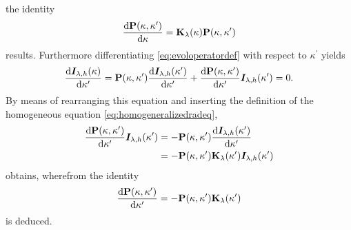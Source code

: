 \documentclass[a4paper,11pt]{report}
\def\lk#1{{\color{black}{#1}}}
\begin{document}
\begin{align}
\begin{aligned}
\end{aligned}
\end{align} the identity \begin{equation}\label{eq:grte_op_id_1}
\frac{\mathrm{d}\boldsymbol{\mathbf{P}}(\kappa,\kappa^\prime)}{\mathrm{d}\kappa} = \boldsymbol{\mathbf{K}}_\lambda(\kappa)\boldsymbol{\mathbf{P}}(\kappa,\kappa^\prime)
\end{equation} results. Furthermore differentiating \cref{eq:evoloperatordef} with respect to $\kappa^\prime$ yields \begin{align}
\begin{aligned}
\frac{\mathrm{d}\bm{I}_{\lambda,h}(\kappa)}{\mathrm{d}\kappa^\prime} = \boldsymbol{\mathbf{P}}(\kappa,\kappa^\prime)\frac{\mathrm{d}\bm{I}_{\lambda,h}(\kappa^\prime)}{\mathrm{d}\kappa^\prime} + \frac{\mathrm{d}\boldsymbol{\mathbf{P}}(\kappa,\kappa^\prime)}{\mathrm{d}\kappa^\prime}\bm{I}_{\lambda,h}(\kappa^\prime) = 0.
\end{aligned}
\end{align} By means of rearranging this equation and inserting the definition of the homogeneous equation \cref{eq:homogeneralizedradeq}, \lk{the expression} \begin{align}
\begin{aligned}
\frac{\mathrm{d}\boldsymbol{\mathbf{P}}(\kappa,\kappa^\prime)}{\mathrm{d}\kappa^\prime}\bm{I}_{\lambda,h}(\kappa^\prime) &= -\boldsymbol{\mathbf{P}}(\kappa,\kappa^\prime)\frac{\mathrm{d}\bm{I}_{\lambda,h}(\kappa^\prime)}{\mathrm{d}\kappa^\prime} \\ &= -\boldsymbol{\mathbf{P}}(\kappa,\kappa^\prime)\boldsymbol{\mathbf{K}}_\lambda(\kappa^\prime)\bm{I}_{\lambda,h}(\kappa^\prime)
\end{aligned}
\end{align} obtains, wherefrom the identity \begin{equation}\label{eq:grte_op_id_2}
\frac{\mathrm{d}\boldsymbol{\mathbf{P}}(\kappa,\kappa^\prime)}{\mathrm{d}\kappa^\prime} = -\boldsymbol{\mathbf{P}}(\kappa,\kappa^\prime)\boldsymbol{\mathbf{K}}_\lambda(\kappa^\prime)
\end{equation} is deduced.
\end{document}
